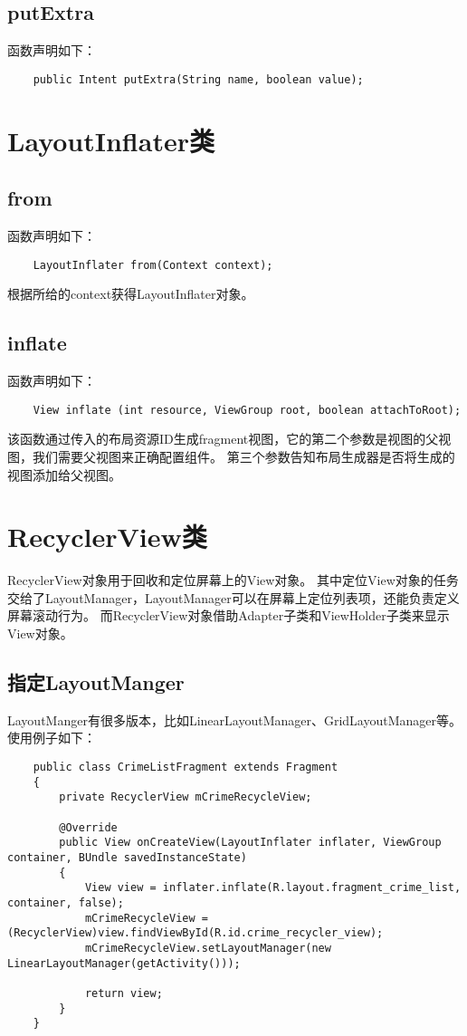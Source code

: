 \documentclass[a4paper,left=2.5cm,right=2.5cm,11pt]{article}
\begin{document}
\subsection{putExtra}
	函数声明如下：
	\begin{lstlisting}
	public Intent putExtra(String name, boolean value);
	\end{lstlisting}

\section{LayoutInflater类}
\subsection{from}
	函数声明如下：
	\begin{lstlisting}
	LayoutInflater from(Context context);
	\end{lstlisting}

	根据所给的context获得LayoutInflater对象。

\subsection{inflate}
	函数声明如下：
	\begin{lstlisting}
	View inflate (int resource, ViewGroup root, boolean attachToRoot);
	\end{lstlisting}

	该函数通过传入的布局资源ID生成fragment视图，它的第二个参数是视图的父视图，我们需要父视图来正确配置组件。
	第三个参数告知布局生成器是否将生成的视图添加给父视图。

\section{RecyclerView类}
	RecyclerView对象用于回收和定位屏幕上的View对象。
	其中定位View对象的任务交给了LayoutManager，LayoutManager可以在屏幕上定位列表项，还能负责定义屏幕滚动行为。
	而RecyclerView对象借助Adapter子类和ViewHolder子类来显示View对象。

\subsection{指定LayoutManger}
	LayoutManger有很多版本，比如LinearLayoutManager、GridLayoutManager等。使用例子如下：
	\begin{lstlisting}
	public class CrimeListFragment extends Fragment
	{
		private RecyclerView mCrimeRecycleView;

		@Override
		public View onCreateView(LayoutInflater inflater, ViewGroup container, BUndle savedInstanceState)
		{
			View view = inflater.inflate(R.layout.fragment_crime_list, container, false);
			mCrimeRecycleView = (RecyclerView)view.findViewById(R.id.crime_recycler_view);
			mCrimeRecycleView.setLayoutManager(new LinearLayoutManager(getActivity()));

			return view;
		}
	}
	\end{lstlisting}
\end{document}
